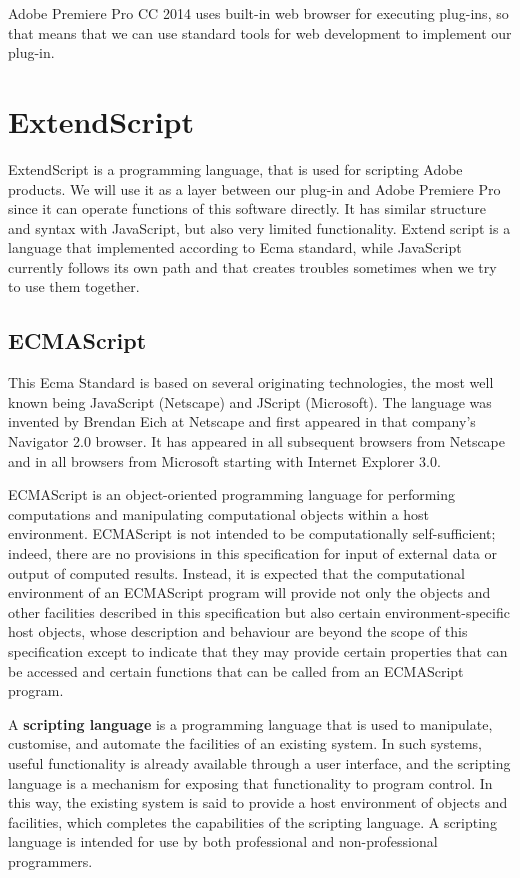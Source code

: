 \documentclass[thesis=B,english]{FITthesis}[2012/10/20]
\begin{document}
Adobe Premiere Pro CC 2014 uses built-in web browser for executing plug-ins, so that means that we can use standard tools for web development to implement our plug-in.

\section{ExtendScript}
ExtendScript is a programming language, that is used for scripting Adobe products. We will use it as a layer between our plug-in and Adobe Premiere Pro since it can operate functions of this software directly. It has similar structure and syntax with JavaScript, but also very limited functionality. Extend script is a language that implemented according to Ecma standard, while JavaScript currently follows its own path and that creates troubles sometimes when we try to use them together. 
\subsection{ECMAScript}
This Ecma Standard is based on several originating technologies, the most well known being JavaScript (Netscape) and JScript (Microsoft). The language was invented by Brendan Eich at Netscape and first appeared in that company’s Navigator 2.0 browser. It has appeared in all subsequent browsers from Netscape and in all browsers from Microsoft starting with Internet Explorer 3.0.

ECMAScript is an object-oriented programming language for performing computations and manipulating computational objects within a host environment. ECMAScript is not intended to be computationally self-sufficient; indeed, there are no provisions in this specification for input of external data or output of computed results. Instead, it is expected that the computational environment of an ECMAScript program will provide not only the objects and other facilities described in this specification but also certain environment-specific host objects, whose description and behaviour are beyond the scope of this specification except to indicate that they may provide certain properties that can be accessed and certain functions that can be called from an ECMAScript program.

A \textbf{scripting language} is a programming language that is used to manipulate, customise, and automate the facilities of an existing system. In such systems, useful functionality is already available through a user interface, and the scripting language is a mechanism for exposing that functionality to program control. In this way, the existing system is said to provide a host environment of objects and facilities, which completes the capabilities of the scripting language. A scripting language is intended for use by both professional and non-professional programmers.
\end{document}
